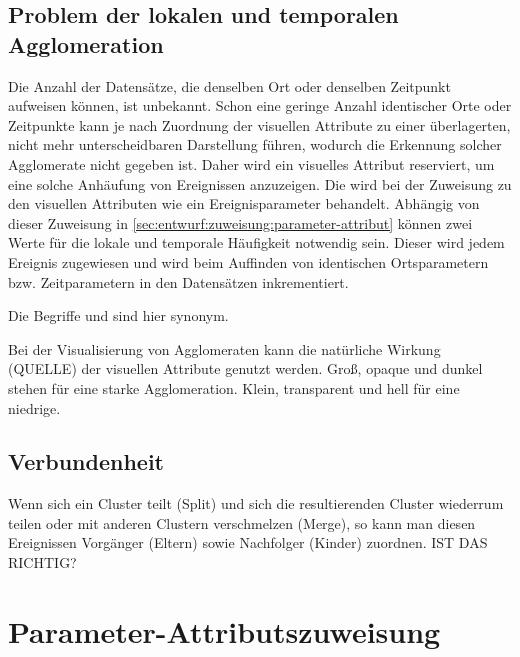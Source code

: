 \subsection{Problem der lokalen und temporalen Agglomeration}\label{sec:entwurf:agglomeration}

Die Anzahl der Datensätze, die denselben Ort oder denselben Zeitpunkt aufweisen können, ist unbekannt. Schon eine geringe Anzahl identischer Orte oder Zeitpunkte kann je nach Zuordnung der visuellen Attribute zu einer überlagerten, nicht mehr unterscheidbaren Darstellung führen, wodurch die Erkennung solcher Agglomerate nicht gegeben ist. Daher wird ein visuelles Attribut reserviert, um eine solche Anhäufung von Ereignissen anzuzeigen. Die  wird bei der Zuweisung zu den visuellen Attributen wie ein Ereignisparameter behandelt. Abhängig von dieser Zuweisung in \autoref{sec:entwurf:zuweisung:parameter-attribut} können zwei Werte für die lokale und temporale Häufigkeit notwendig sein. Dieser wird jedem Ereignis zugewiesen und wird beim Auffinden von identischen Ortsparametern bzw. Zeitparametern in den Datensätzen inkrementiert.

Die Begriffe  und  sind hier synonym.

Bei der Visualisierung von Agglomeraten kann die natürliche Wirkung (QUELLE) der visuellen Attribute genutzt werden. Groß, opaque und dunkel stehen für eine starke Agglomeration. Klein, transparent und hell für eine niedrige.

\subsection{Verbundenheit}\label{sec:entwurf:verbundenheit}
Wenn sich ein Cluster teilt (Split) und sich die resultierenden Cluster wiederrum teilen oder mit anderen Clustern verschmelzen (Merge), so kann man diesen Ereignissen Vorgänger (Eltern) sowie Nachfolger (Kinder) zuordnen. IST DAS RICHTIG?



\section{Parameter-Attributszuweisung}\label{sec:entwurf:zuweisung:parameter-attribut}

